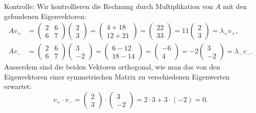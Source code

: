 \begin{loesung}
Kontrolle: Wir kontrollieren die Rechnung durch Multiplikation von $A$
mit den gefundenen Eigenvektoren:
\begin{align*}
Av_+&=\begin{pmatrix}2&6\\6&7\end{pmatrix}\begin{pmatrix}2\\3\end{pmatrix}
=\begin{pmatrix}4+18\\ 12 + 21\end{pmatrix}
=\begin{pmatrix}22\\ 33\end{pmatrix}=11\begin{pmatrix}2\\3\end{pmatrix}
=\lambda_+v_+,\\
Av_-&=\begin{pmatrix}2&6\\6&7\end{pmatrix}\begin{pmatrix}3\\-2\end{pmatrix}
=\begin{pmatrix}6-12\\18-14 \end{pmatrix}
=\begin{pmatrix}-6\\4 \end{pmatrix}=-2\begin{pmatrix}3\\-2\end{pmatrix}
=\lambda_-v_-.
\end{align*}
Ausserdem sind die beiden Vektoren orthogonal, wie man das von den Eigenvektoren
einer symmetrischen Matrix zu verschiedenen Eigenwerten erwartet:
\[
v_+\cdot v_-=
\begin{pmatrix}2\\3\end{pmatrix}
\cdot
\begin{pmatrix}3\\-2\end{pmatrix}
=2\cdot 3 + 3\cdot(-2)=0.
\]
\end{loesung}

